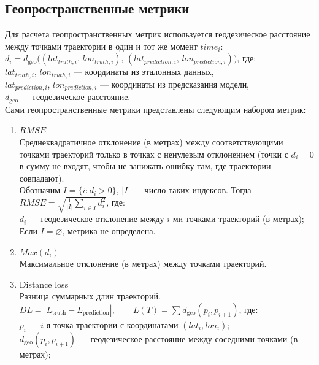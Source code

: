 \documentclass[a4paper,12pt]{report}
\begin{document}
	\subsection*{Геопространственные метрики}
	Для расчета геопространственных метрик используется геодезическое расстояние между точками траектории в один и тот же момент $time_i$:\\
	$d_i = d_{\mathrm{geo}}\bigl((lat_{truth,i},\, lon_{truth,i}),\, (lat_{prediction,i},\, lon_{prediction,i})\bigr)$, где:\\
	$lat_{truth,i}$, $lon_{truth,i}$ --- координаты из эталонных данных,\\
	$lat_{prediction,i}$, $lon_{prediction,i}$ --- координаты из предсказания модели,\\
	$d_{\mathrm{geo}}$ --- геодезическое расстояние.\\
	Сами геопространственные метрики представлены следующим набором метрик:
	\begin{enumerate}
		\item $RMSE$\\
		Среднеквадратичное отклонение (в метрах) между соответствующими точками траекторий только в точках с ненулевым отклонением (точки с $d_i = 0$ в сумму не входят, чтобы не занижать ошибку там, где траектории совпадают).\\
		Обозначим $I=\{i : d_i > 0\}$, $|I|$ --- число таких индексов. Тогда
		$RMSE=\sqrt{\frac{1}{|I|}\sum_{i\in I} d_i^2}$, где:\\
		$d_i$ --- геодезическое отклонение между $i$-ми точками траекторий (в метрах);
		Если $I=\varnothing$, метрика не определена.\\
		\item $Max(d_i)$\\
		Максимальное отклонение (в метрах) между точками траекторий.
		\item Distance loss\\
		Разница суммарных длин траекторий.
		$DL=|L_{\mathrm{truth}}-L_{\mathrm{prediction}}|,  \qquad L(T)=\sum d_{\mathrm{geo}}(p_i,p_{i+1})$, где:\\
		$p_i$ --- $i$-я точка траектории с координатами $(lat_i, lon_i)$;\\
		$d_{\mathrm{geo}}(p_i,p_{i+1})$ --- геодезическое расстояние между соседними точками (в метрах);
	\end{enumerate}
\end{document}
